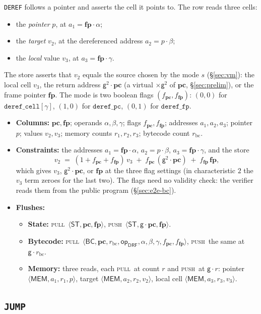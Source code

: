 \documentclass[11pt]{article}
\newcommand{\gen}{\mathsf{g}}
\newcommand{\pc}{\mathbf{pc}}
\newcommand{\fp}{\mathbf{fp}}
\newcommand{\push}{\textsc{push}}
\newcommand{\pull}{\textsc{pull}}
\newcommand{\tup}[1]{\langle #1 \rangle}
\newcommand{\dsep}[1]{\mathsf{#1}}
\newcommand{\opc}[1]{\mathsf{op}_{\mathsf{#1}}}
\begin{document}
\texttt{DEREF} follows a pointer and asserts the cell it points to. The row reads three cells:
\begin{itemize}
\item the \emph{pointer} $p$, at $a_1=\fp\cdot\alpha$;
\item the \emph{target} $v_2$, at the dereferenced address $a_2=p\cdot\beta$;
\item the \emph{local} value $v_3$, at $a_3=\fp\cdot\gamma$.
\end{itemize}
The store asserts that $v_2$ equals the source chosen by the mode $s$ (\S\ref{sec:vm}): the local cell $v_3$, the return address $\gen^{2}\cdot\pc$ (a virtual $\times\gen^{2}$ of $\pc$, \S\ref{sec:prelim}), or the frame pointer $\fp$. The mode is two boolean flags $(f_{\pc},f_{\fp})$: $(0,0)$ for $\texttt{deref\_cell}[\gamma]$, $(1,0)$ for $\texttt{deref\_pc}$, $(0,1)$ for $\texttt{deref\_fp}$.
\begin{itemize}
\item \textbf{Columns:} $\pc,\fp$; operands $\alpha,\beta,\gamma$; flags $f_{\pc},f_{\fp}$; addresses $a_1,a_2,a_3$; pointer $p$; values $v_2,v_3$; memory counts $r_1,r_2,r_3$; bytecode count $r_{\mathrm{bc}}$.
\item \textbf{Constraints:} the addresses $a_1=\fp\cdot\alpha$, $a_2=p\cdot\beta$, $a_3=\fp\cdot\gamma$, and the store
\[
  v_2 \;=\; (1+f_{\pc}+f_{\fp})\,v_3 \;+\; f_{\pc}\,(\gen^{2}\cdot\pc) \;+\; f_{\fp}\,\fp ,
\]
which gives $v_3$, $\gen^{2}\cdot\pc$, or $\fp$ at the three flag settings (in characteristic $2$ the $v_3$ term zeroes for the last two). The flags need no validity check: the verifier reads them from the public program (\S\ref{sec:e2e-bc}).
\item \textbf{Flushes:}
  \begin{itemize}
  \item \textbf{State:} \pull\ $\tup{\dsep{ST},\pc,\fp}$, \push\ $\tup{\dsep{ST},\gen\cdot\pc,\fp}$.
  \item \textbf{Bytecode:} \pull\ $\tup{\dsep{BC},\pc,r_{\mathrm{bc}},\opc{DRF},\alpha,\beta,\gamma,f_{\pc},f_{\fp}}$, \push\ the same at $\gen\cdot r_{\mathrm{bc}}$.
  \item \textbf{Memory:} three reads, each \pull\ at count $r$ and \push\ at $\gen\cdot r$: pointer $\tup{\dsep{MEM},a_1,r_1,p}$, target $\tup{\dsep{MEM},a_2,r_2,v_2}$, local cell $\tup{\dsep{MEM},a_3,r_3,v_3}$.
  \end{itemize}
\end{itemize}

\subsection{\texttt{JUMP}}\label{sec:tab-jump}
\end{document}

